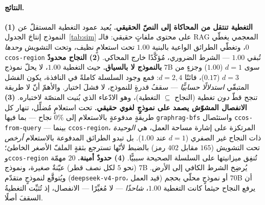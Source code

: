 \documentclass[11pt]{article}
\newcommand{\code}[1]{\textenglish{\texttt{#1}}}
\begin{document}
\paragraph{النتائج.}
\textbf{(1) التغطية تنتقل من المحاكاة إلى النصّ الحقيقي.} يُعيد عمود التغطية المستقلّ عن
النموذج إنتاجَ الجدول~\ref{tab:sim} على محتوى ملفاتٍ حقيقي: فالـ RAG المعجمي يغطّي $0$،
وتغطّي الطرائق الواعية بالبنية $1.00$ تحت استعلامٍ نظيف، وتحت التشويش \emph{وحدها}
\code{ccos-region} تُبقي $1.00$ --- الشرط الضروري، مُؤكَّدًا خارج المحاكي.
\textbf{(2) النجاح محدودٌ بالنموذج لا بالسياق.} حيث التغطية $1.00$، لا يحلّ نموذج $7$B سوى
$d{=}1$ ($1.00$) وجزءٍ من $d{=}3$ ($0.17$)، فائتًا $d{=}2,4$: فمع وجود السلسلة كاملةً في
النافذة، يكون الفشل المتبقّي \emph{استدلالًا حسابيًّا} --- سقفُ قدرةٍ للنموذج، لا فشلَ
اختيار. والأهمّ أنّ لا طريقة تنجح قطّ \emph{دون} تغطية (النجاح $\subseteq$ التغطية)، وهو
الادّعاء الذي بُنيت المنصّة لاختباره.
\textbf{(3) الانفصال المشوّش يصمد على نموذجٍ لغوي حقيقي.} تحت استعلامٍ مُضلِّل، تنهار كل
طريقةٍ مدفوعةٍ بالاستعلام إلى $0\%$ نجاح --- بما فيها \code{graphrag-bfs} واستئصال
\code{ccos-from-query} --- بينما \code{ccos-region}، المرتكزة على إشارة مساحة العمل، هي
\emph{الوحيدة} ذات النجاح غير الصفري ($d{=}1$ عند $1.00$). بل تبدو الطرائق المدفوعة
بالاستعلام \emph{أرخص} تحت التشويش ($165$ مقابل $402$ رمز) بالضبط لأنّها تسترجع بثقةٍ الملفّ
الأصغر الخاطئ؛ و\code{ccos-region} تُنفِق ميزانيتها على السلسلة الصحيحة سببيًّا.
\textbf{(4) حدودٌ أمينة.} $20$ مهمّة (نحو $5$ لكل نصف قطر) عيّنةٌ صغيرة، ونموذج $7$B يُرضِخ
الشرط الكافي إلى الأرض. ويُتوقَّع لنموذجٍ متقدّم (\code{deepseek-v4-pro}، قيد العمل) أو
نموذجٍ محلّي بحجم $70$B أن يرفع النجاح حيثما كانت التغطية $1.00$، \emph{شاحذًا} --- لا مُغيِّرًا
--- الانفصال، إذ تُثبِّت التغطيةُ السقفَ أصلًا.
\end{document}
